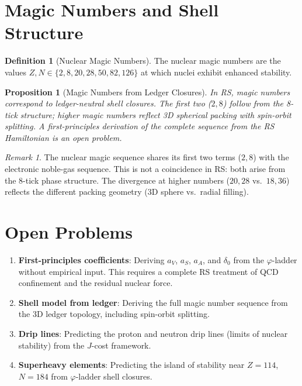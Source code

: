 \documentclass[12pt,a4paper]{article}
\newtheorem{proposition}[theorem]{Proposition}
\theoremstyle{definition}
\newtheorem{definition}[theorem]{Definition}
\theoremstyle{remark}
\newtheorem{remark}[theorem]{Remark}
\begin{document}
\section{Magic Numbers and Shell Structure}
\label{sec:magic}

\begin{definition}[Nuclear Magic Numbers]
\label{def:magic}
The nuclear magic numbers are the values
$Z,N \in \{2, 8, 20, 28, 50, 82, 126\}$ at which nuclei
exhibit enhanced stability.
\end{definition}

\begin{proposition}[Magic Numbers from Ledger Closures]
\label{prop:magic}
In RS, magic numbers correspond to ledger-neutral shell
closures.  The first two ($2, 8$) follow from the 8-tick
structure; higher magic numbers reflect 3D spherical packing
with spin-orbit splitting.  A first-principles derivation of
the complete sequence from the RS Hamiltonian is an open
problem.
\end{proposition}

\begin{remark}
The nuclear magic sequence shares its first two terms ($2, 8$)
with the electronic noble-gas sequence.  This is not a
coincidence in RS: both arise from the 8-tick phase structure.
The divergence at higher numbers ($20, 28$ vs.\ $18, 36$)
reflects the different packing geometry (3D sphere vs.\ radial
filling).
\end{remark}

\section{Open Problems}
\label{sec:open}

\begin{enumerate}
  \item \textbf{First-principles coefficients}: Deriving $a_V$,
  $a_S$, $a_A$, and $\delta_0$ from the $\varphi$-ladder
  without empirical input.  This requires a complete RS
  treatment of QCD confinement and the residual nuclear force.

  \item \textbf{Shell model from ledger}: Deriving the full
  magic number sequence from the 3D ledger topology, including
  spin-orbit splitting.

  \item \textbf{Drip lines}: Predicting the proton and neutron
  drip lines (limits of nuclear stability) from the $J$-cost
  framework.

  \item \textbf{Superheavy elements}: Predicting the island
  of stability near $Z = 114$, $N = 184$ from $\varphi$-ladder
  shell closures.
\end{enumerate}
\end{document}
